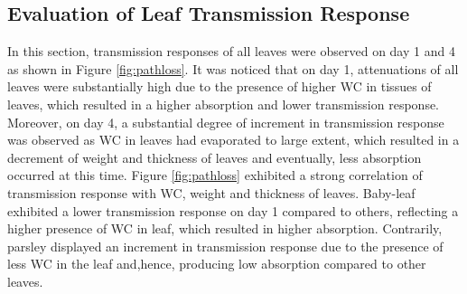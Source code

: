 \documentclass[preprints,article,accept,moreauthors,pdftex]{Definitions/mdpi}
\renewcommand{\^}{\hat}  %
\begin{document}
\subsection{Evaluation of Leaf Transmission Response}
%
In this section, transmission responses of all leaves were observed on day 1 and 4 as shown in Figure \ref{fig:pathloss}. It was noticed that on day 1, attenuations of all leaves were substantially high due to the presence of higher WC in tissues of leaves, which resulted in a higher absorption and lower transmission response. Moreover, on day 4, a substantial degree of increment in transmission response was observed as WC in leaves had evaporated to large extent, which resulted in a decrement of weight and thickness of leaves and eventually, less absorption occurred at this time. Figure \ref{fig:pathloss} exhibited a strong correlation of transmission response with WC, weight and thickness of leaves. Baby-leaf exhibited a lower transmission response on day 1 compared to others, reflecting a higher presence of WC in leaf, which resulted in higher absorption. Contrarily, parsley displayed an increment in transmission response due to the presence of less WC in the leaf and,hence, producing low absorption compared to other leaves.
%
\end{document}
